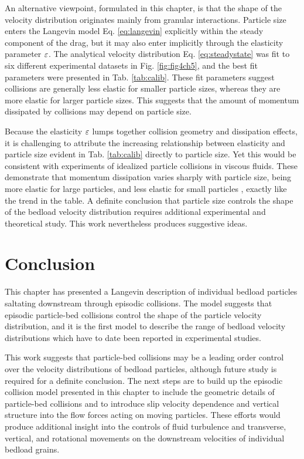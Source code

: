 An alternative viewpoint, formulated in this chapter, is that the shape of the velocity distribution originates mainly from granular interactions.
Particle size enters the Langevin model Eq. \ref{eq:langevin} explicitly within the steady component of the drag, but it may also enter implicitly through the elasticity parameter $\varepsilon$.
The analytical velocity distribution Eq. \ref{eq:steadystate} was fit to six different experimental datasets in Fig. \ref{fig:fig4ch5}, and the best fit parameters were presented in Tab. \ref{tab:calib}.
These fit parameters suggest collisions are generally less elastic for smaller particle sizes, whereas they are more elastic for larger particle sizes. This suggests that the amount of momentum dissipated by collisions may depend on particle size.

Because the elasticity $\varepsilon$ lumps together collision geometry and dissipation effects, it is challenging to attribute the increasing relationship between elasticity and particle size evident in Tab. \ref{tab:calib} directly to particle size.
Yet this would be consistent with experiments of idealized particle collisions in viscous fluids. These demonstrate that momentum dissipation varies sharply with particle size, being more elastic for large particles, and less elastic for small particles \citep{Joseph2001,Yang2006,Schmeeckle2001}, exactly like the trend in the table.
A definite conclusion that particle size controls the shape of the bedload velocity distribution requires additional experimental and theoretical study. This work nevertheless produces suggestive ideas.

\section{Conclusion}
\label{sec:langconclusion}
This chapter has presented a Langevin description of individual bedload particles saltating downstream through episodic collisions.
The model suggests that episodic particle-bed collisions control the shape of the particle velocity distribution, and it is the first model to describe the range of bedload velocity distributions which have to date been reported in experimental studies.

This work suggests that particle-bed collisions may be a leading order control over the velocity distributions of bedload particles, although future study is required for a definite conclusion.
The next steps are to build up the episodic collision model presented in this chapter to include the geometric details of particle-bed collisions and to introduce slip velocity dependence and vertical structure into the flow forces acting on moving particles.
These efforts would produce additional insight into the controls of fluid turbulence and transverse, vertical, and rotational movements on the downstream velocities of individual bedload grains.



